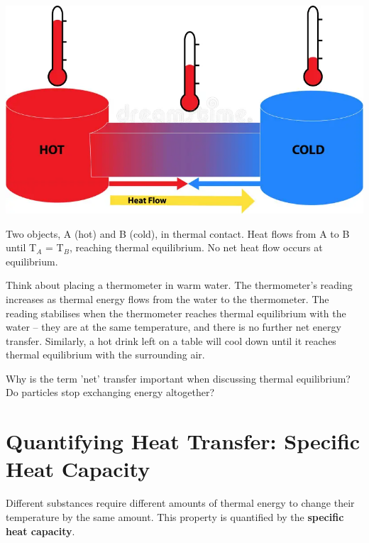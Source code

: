 \begin{marginfigure}[0pt]
\includegraphics[width=\linewidth]{heat-flow-hot-cold-objects} %
\caption{Two objects, A (hot) and B (cold), in thermal contact. Heat flows from A to B until T\(_A\) = T\(_B\), reaching thermal equilibrium. No net heat flow occurs at equilibrium.}
\label{fig:thermal_equilibrium}
\end{marginfigure}

Think about placing a thermometer in warm water. The thermometer's reading increases as thermal energy flows from the water to the thermometer. The reading stabilises when the thermometer reaches thermal equilibrium with the water – they are at the same temperature, and there is no further net energy transfer. Similarly, a hot drink left on a table will cool down until it reaches thermal equilibrium with the surrounding air.

\begin{stopandthink}
Why is the term 'net' transfer important when discussing thermal equilibrium? Do particles stop exchanging energy altogether?
\end{stopandthink}


\FloatBarrier

\section{Quantifying Heat Transfer: Specific Heat Capacity}
\label{sec:specific_heat}
\FloatBarrier

Different substances require different amounts of thermal energy to change their temperature by the same amount. This property is quantified by the \textbf{specific heat capacity}.

